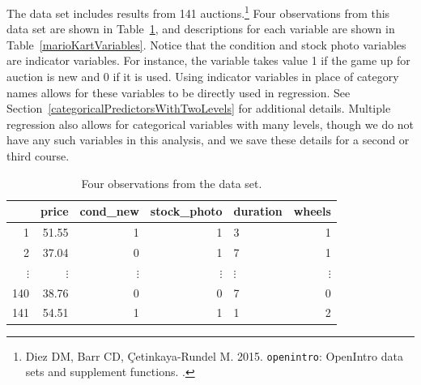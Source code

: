The data set  includes results from 141 auctions.\footnote{Diez DM, Barr CD, \c{C}etinkaya-Rundel M. 2015. \texttt{openintro}: OpenIntro data sets and supplement functions. .} Four observations from this data set are shown in Table~\ref{marioKartDataMatrix}, and descriptions for each variable are shown in Table~\ref{marioKartVariables}. Notice that the condition and stock photo variables are indicator variables. For instance, the  variable takes value 1 if the game up for auction is new and 0 if it is used. Using indicator variables in place of category names allows for these variables to be directly used in regression. See Section~\ref{categoricalPredictorsWithTwoLevels} for additional details. Multiple regression also allows for categorical variables with many levels, though we do not have any such variables in this analysis, and we save these details for a second or third course.

\begin{table}[ht]
\centering
\begin{tabular}{rrrrlr}
  \hline
 & price & cond\_\hspace{0.3mm}new & stock\_\hspace{0.3mm}photo & duration & wheels \\ 
  \hline
1 & 51.55 &   1 & 1 & 3 &   1 \\ 
  2 & 37.04 &  0 &  1 & 7 &   1 \\ 
$\vdots$ &$\vdots$ &$\vdots$ &$\vdots$ &$\vdots$ &$\vdots$ \\
  140 & 38.76 &  0 &  0 & 7 &   0 \\ 
  141 & 54.51 &  1 &  1 & 1 &   2 \\ 
   \hline
\end{tabular}
\caption{Four observations from the  data set.}
\label{marioKartDataMatrix}
\end{table}

